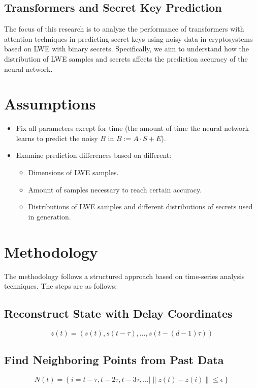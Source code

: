 \documentclass[12pt,a4paper]{article}
\begin{document}
\subsection{Transformers and Secret Key Prediction}
The focus of this research is to analyze the performance of transformers with attention techniques in predicting secret keys using noisy data in cryptosystems based on LWE with binary secrets. Specifically, we aim to understand how the distribution of LWE samples and secrets affects the prediction accuracy of the neural network.

\section{Assumptions}
\begin{itemize}
    \item Fix all parameters except for time (the amount of time the neural network learns to predict the noisy $B$ in $B := A \cdot S + E$).
    \item Examine prediction differences based on different:
    \begin{itemize}
        \item Dimensions of LWE samples.
        \item Amount of samples necessary to reach certain accuracy.
        \item Distributions of LWE samples and different distributions of secrets used in generation.
    \end{itemize}
\end{itemize}

\section{Methodology}
The methodology follows a structured approach based on time-series analysis techniques. The steps are as follows:

\subsection{Reconstruct State with Delay Coordinates}
\begin{equation}
    z(t) = \left(s(t), s(t - \tau), \ldots, s(t - (d - 1)\tau)\right)
\end{equation}

\subsection{Find Neighboring Points from Past Data}
\begin{equation}
    N(t) = \left\{i = t - \tau, t - 2\tau, t - 3\tau, \ldots \mid \|z(t) - z(i)\| \leq \epsilon\right\}
\end{equation}
\end{document}

